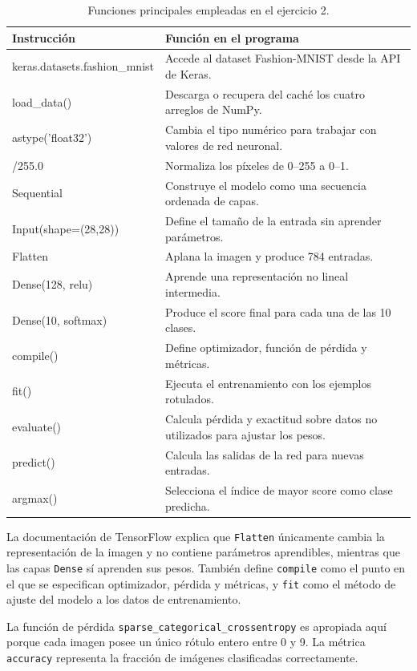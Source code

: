 \documentclass[14pt,twoside]{article}
\begin{document}
\begin{table}[H]
\centering
\caption{Funciones principales empleadas en el ejercicio 2.}
\small
\begin{tabularx}{\textwidth}{>{\ttfamily}l X}
\toprule
\textnormal{Instrucción} & \textnormal{Función en el programa} \\
\midrule
keras.datasets.fashion\_mnist & Accede al dataset Fashion-MNIST desde la API de Keras. \\
load\_data() & Descarga o recupera del caché los cuatro arreglos de NumPy. \\
astype('float32') & Cambia el tipo numérico para trabajar con valores de red neuronal. \\
/255.0 & Normaliza los píxeles de 0--255 a 0--1. \\
Sequential & Construye el modelo como una secuencia ordenada de capas. \\
Input(shape=(28,28)) & Define el tamaño de la entrada sin aprender parámetros. \\
Flatten & Aplana la imagen y produce 784 entradas. \\
Dense(128, relu) & Aprende una representación no lineal intermedia. \\
Dense(10, softmax) & Produce el score final para cada una de las 10 clases. \\
compile() & Define optimizador, función de pérdida y métricas. \\
fit() & Ejecuta el entrenamiento con los ejemplos rotulados. \\
evaluate() & Calcula pérdida y exactitud sobre datos no utilizados para ajustar los pesos. \\
predict() & Calcula las salidas de la red para nuevas entradas. \\
argmax() & Selecciona el índice de mayor score como clase predicha. \\
\bottomrule
\end{tabularx}
\end{table}

La documentación de TensorFlow explica que \texttt{Flatten} únicamente cambia la representación de la imagen y no contiene parámetros aprendibles, mientras que las capas \texttt{Dense} sí aprenden sus pesos. También define \texttt{compile} como el punto en el que se especifican optimizador, pérdida y métricas, y \texttt{fit} como el método de ajuste del modelo a los datos de entrenamiento. \cite{tensorflowfashion}

La función de pérdida \texttt{sparse\_categorical\_crossentropy} es apropiada aquí porque cada imagen posee un único rótulo entero entre 0 y 9. La métrica \texttt{accuracy} representa la fracción de imágenes clasificadas correctamente.
\end{document}
